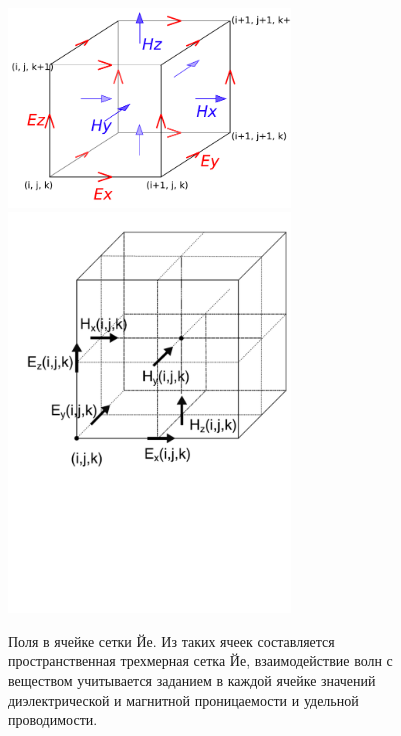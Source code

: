 \begin{figure}[p]
\label{fig:YeeCell}
\centering
\includegraphics[width=75mm]{graphics/yee-cell}
\includegraphics[width=75mm]{graphics/Yee-Cubes}
\caption{Поля в ячейке сетки Йе.
    Из таких ячеек составляется пространственная трехмерная сетка Йе, взаимодействие
    волн с веществом учитывается заданием в каждой ячейке значений диэлектрической
    и магнитной проницаемости и удельной проводимости.}
\end{figure}
